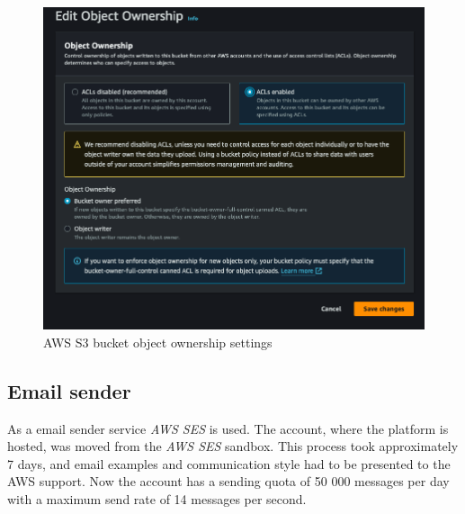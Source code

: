 \begin{figure}[H]\centering
\includegraphics[width=140mm]{img/docs/fig_aws_object_ownership.png}
\caption{AWS S3 bucket object ownership settings}
\label{img:admin-manual-aws.s3.acls}
\end{figure}


\subsection{Email sender}
As a email sender service \textit{AWS \ac{SES}} is used.
The account, where the platform is hosted, was moved from the \textit{AWS \ac{SES}} sandbox.
This process took approximately 7 days, and email examples and communication style had to be presented to the AWS support. 
Now the account has a sending quota of 50 000 messages per day with a maximum send rate of 14 messages per second.